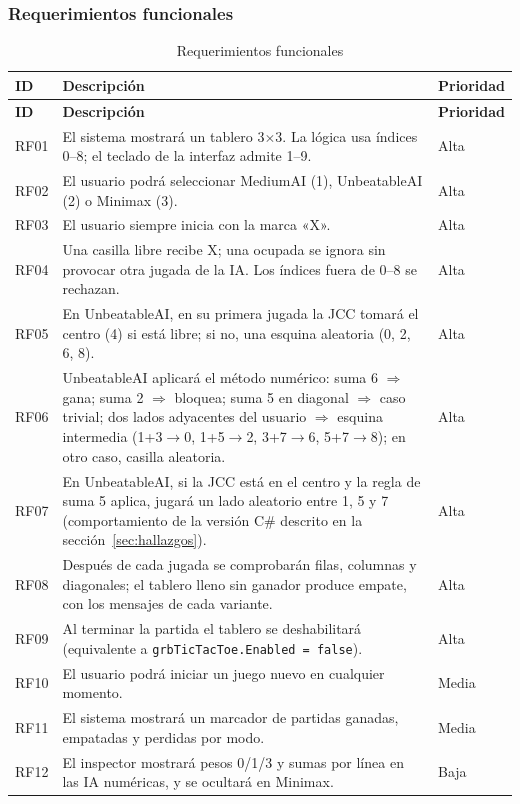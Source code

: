 \documentclass[12pt,a4paper]{article}
\begin{document}
\subsubsection{Requerimientos funcionales}
\begin{longtable}{p{1.3cm}p{9.2cm}p{2.6cm}}
\caption{Requerimientos funcionales}\\
\toprule
\textbf{ID} & \textbf{Descripción} & \textbf{Prioridad}\\
\midrule\endfirsthead
\toprule
\textbf{ID} & \textbf{Descripción} & \textbf{Prioridad}\\
\midrule\endhead
RF01 & El sistema mostrará un tablero 3$\times$3. La lógica usa índices 0--8; el teclado de la interfaz admite 1--9. & Alta\\
RF02 & El usuario podrá seleccionar MediumAI (1), UnbeatableAI (2) o Minimax (3). & Alta\\
RF03 & El usuario siempre inicia con la marca «X». & Alta\\
RF04 & Una casilla libre recibe X; una ocupada se ignora sin provocar otra jugada de la IA. Los índices fuera de 0--8 se rechazan. & Alta\\
RF05 & En UnbeatableAI, en su primera jugada la JCC tomará el centro (4) si está libre; si no, una esquina aleatoria (0, 2, 6, 8). & Alta\\
RF06 & UnbeatableAI aplicará el método numérico: suma 6 $\Rightarrow$ gana; suma 2 $\Rightarrow$ bloquea; suma 5 en diagonal $\Rightarrow$ caso trivial; dos lados adyacentes del usuario $\Rightarrow$ esquina intermedia (1+3$\to$0, 1+5$\to$2, 3+7$\to$6, 5+7$\to$8); en otro caso, casilla aleatoria. & Alta\\
RF07 & En UnbeatableAI, si la JCC está en el centro y la regla de suma 5 aplica, jugará un lado aleatorio entre 1, 5 y 7 (comportamiento de la versión C\# descrito en la sección~\ref{sec:hallazgos}). & Alta\\
RF08 & Después de cada jugada se comprobarán filas, columnas y diagonales; el tablero lleno sin ganador produce empate, con los mensajes de cada variante. & Alta\\
RF09 & Al terminar la partida el tablero se deshabilitará (equivalente a \texttt{grbTicTacToe.Enabled = false}). & Alta\\
RF10 & El usuario podrá iniciar un juego nuevo en cualquier momento. & Media\\
RF11 & El sistema mostrará un marcador de partidas ganadas, empatadas y perdidas por modo. & Media\\
RF12 & El inspector mostrará pesos 0/1/3 y sumas por línea en las IA numéricas, y se ocultará en Minimax. & Baja\\

\end{longtable}
\end{document}
